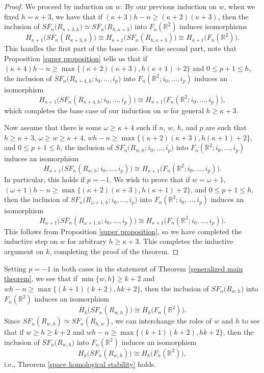 \documentclass[pagebackref,colorlinks,citecolor=blue,linkcolor=blue,urlcolor=blue,filecolor=blue]{article}
\theoremstyle{definition}\newtheorem{definition}[thm]{Definition}
\theoremstyle{definition}
\newcommand{\R}{\ensuremath{\mathbb{R}}}
\begin{document}
\begin{proof}
We proceed by induction on $w$.
By our previous induction on $w$, when we fixed $h=\kappa+3$, we have that if $(\kappa+3)h-n\ge (\kappa+2)(\kappa+3)$, then the inclusion of $SF_{n}\big(R_{\kappa+3,h})\simeq SF_{n}\big(R_{h,\kappa+3})$ into $F_{n}(\R^{2})$ induces isomorphisms
\[
H_{\kappa+1}\big(SF_{n}(R_{\kappa+3, h})\big)\cong H_{\kappa+1}\big(SF_{n}(R_{h, \kappa+3})\big)\cong  H_{\kappa+1}\big(F_{n}(\R^{2})\big).
\]
This handles the first part of the base case.
For the second part, note that Proposition \ref{super proposition} tells us that if $(\kappa+4)h-n\ge\max\{(\kappa+2)(\kappa+3), h(\kappa+1)+2\big\}$ and $0\le p+1\le h$, the inclusion of $SF_{n}\big(R_{\kappa+4,h}; i_{0}, \dots, i_{p})$ into $F_{n}(\R^{2}; i_{0}, \dots, i_{p})$ induces an isomorphism
\[
H_{\kappa+1}\big(SF_{n}(R_{\kappa+4, h}; i_{0}, \dots, i_{p})\big)\cong H_{\kappa+1}\big(F_{n}(\R^{2}; i_{0}, \dots, i_{p})\big),
\]
which completes the base case of our induction on $w$ for general $h\ge \kappa+3$.

Now assume  that there is some $\omega\ge \kappa+4$ such if $n$, $w$, $h$, and $p$ are such that $h\ge \kappa+3$, $\omega\ge w\ge \kappa+4$, $wh-n\ge \max\big\{(\kappa+2)(\kappa+3), h(\kappa+1)+2\big\}$, and $0\le p+1\le h$, the inclusion of $SF_{n}\big(R_{w,h};i_{0}, \dots, i_{p})$ into $F_{n}(\R^{2}; i_{0}, \dots, i_{p})$ induces an isomorphism 
\[
H_{\kappa+1}\big(SF_{n}(R_{w, h};i_{0}, \dots, i_{p})\big)\cong H_{\kappa+1}\big(F_{n}(\R^{2};i_{0}, \dots, i_{p})\big).
\]
In particular, this holds if $p=-1$.
We wish to prove that if $w=\omega+1$, $(\omega+1)h-n\ge\max\big\{(\kappa+2)(\kappa+3), h(\kappa+1)+2\big\}$, and $0\le p+1\le h$, then the inclusion of $SF_{n}\big(R_{\omega+1,h};i_{0}, \dots, i_{p})$ into $F_{n}(\R^{2}; i_{0}, \dots, i_{p})$ induces an isomorphism 
\[
H_{\kappa+1}\big(SF_{n}(R_{\omega+1, h};i_{0}, \dots, i_{p})\big)\cong H_{\kappa+1}\big(F_{n}(\R^{2};i_{0}, \dots, i_{p})\big).
\]
This follows from Proposition \ref{super proposition}, so we have completed the inductive step on $w$ for arbitrary $h\ge \kappa+3$.
This completes the inductive argument on $k$, completing the proof of the theorem.
\end{proof}

Setting $p=-1$ in both cases in the statement of Theorem \ref{generalized main theorem}, we see that if $\min\{w,h\}\ge k+2$ and $wh-n\ge \max\big\{(k+1)(k+2), hk+2\big\}$, then the inclusion of $SF_{n}\big(R_{w,h})$ into $F_{n}(\R^{2})$ induces an isomorphism 
\[
H_{k}\big(SF_{n}(R_{w, h})\big)\cong H_{k}\big(F_{n}(\R^{2})\big).
\]
Since $SF_{n}(R_{w, h})\simeq SF_{n}(R_{h, w})$, we can interchange the roles of $w$ and $h$ to see that if $w\ge h\ge k+2$ and $wh-n\ge \max\big\{(k+1)(k+2), hk+2\big\}$, then the inclusion of $SF_{n}\big(R_{w,h})$ into $F_{n}(\R^{2})$ induces an isomorphism 
\[
H_{k}\big(SF_{n}(R_{w, h})\big)\cong H_{k}\big(F_{n}(\R^{2})\big),
\]
i.e., Theorem \ref{space homological stability} holds.
\end{document}
